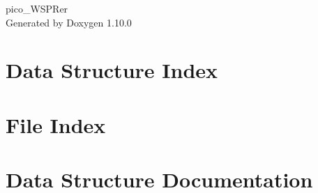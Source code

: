 \documentclass[twoside]{book}
\newcommand{\+}{\discretionary{\mbox{\scriptsize$\hookleftarrow$}}{}{}}
\newcommand{\clearemptydoublepage}{%
    \newpage{\pagestyle{empty}\cleardoublepage}%
  }
\begin{document}
  \raggedbottom
    \hypersetup{pageanchor=false,
                bookmarksnumbered=true,
                pdfencoding=unicode
               }
  \begin{titlepage}
  \vspace*{7cm}
  \begin{center}%
  {\Large pico\+\_\+\+WSPRer}\\
  \vspace*{1cm}
  {\large Generated by Doxygen 1.10.0}\\
  \end{center}
  \end{titlepage}
  \clearemptydoublepage
  \tableofcontents
  \clearemptydoublepage
  \hypersetup{pageanchor=true}


\chapter{Data Structure Index}

\chapter{File Index}

\chapter{Data Structure Documentation}








\end{document}

